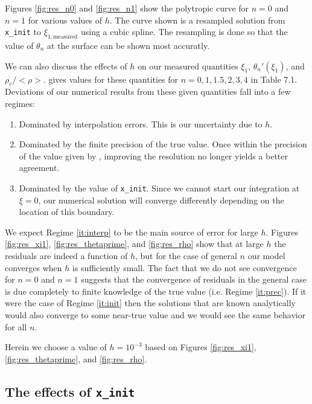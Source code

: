 \documentclass[twocolumn]{aastex631}
\begin{document}
Figures \ref{fig:res_n0} and \ref{fig:res_n1} show the
polytropic curve for $n=0$ and $n=1$ for various
values of $h$. The curve shown is a resampled solution from
\texttt{x\_init} to $\xi_{1,\text{measured}}$ using a cubic spline.
The resampling is done so that the value of $\theta_n$ at
the surface can be shown most accuratly.





We can also discuss the effects of $h$ on our measured quantities
$\xi_1$, $\theta_n'(\xi_1)$, and $\rho_c/<\rho>$. \citet{textbook}
gives values for these quantities for $n=0,1,1.5,2,3,4$ in Table 7.1.
Deviations of our numerical results from these given quantities fall
into a few regimes:

\begin{enumerate}
    \item Dominated by interpolation errors. This is our uncertainty
    due to $h$. \label{it:interp}
    \item Dominated by the finite precision of the true value. Once
    within the precision of the value given by \citet{textbook},
    improving the resolution no longer yields a better agreement.
    \label{it:prec}
    \item Dominated by the value of \texttt{x\_init}. Since we
    cannot start our integration at $\xi=0$, our numerical solution
    will converge differently depending on the location of this boundary.
    \label{it:init}
\end{enumerate}

We expect Regime \ref{it:interp} to be the main source of error for
large $h$. Figures \ref{fig:res_xi1}, \ref{fig:res_thetaprime},
and \ref{fig:res_rho} show that at large $h$ the residuals
are indeed a function of $h$, but for the case of general $n$ our
model converges when $h$ is sufficiently small. The fact that we
do not see convergence for $n=0$ and $n=1$ suggests that the convergence
of residuals in the general case is due completely to finite knowledge
of the true value (i.e. Regime \ref{it:prec}). If it were the case of
Regime \ref{it:init} then the solutions that are known analytically
would also converge to some near-true value and we would see the same behavior
for all $n$.



Herein we choose a value of $h = 10^{-3}$ based on Figures \ref{fig:res_xi1},
\ref{fig:res_thetaprime}, and \ref{fig:res_rho}.

\subsection{The effects of \texttt{x\_init}}
\label{subsec:init}
\end{document}
